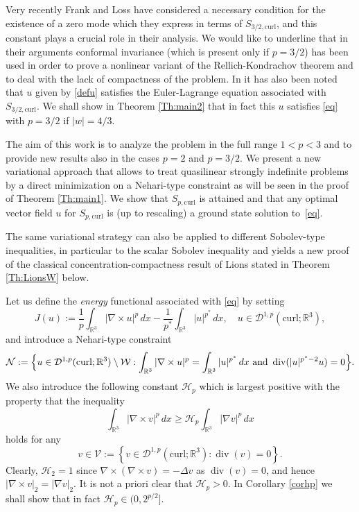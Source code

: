 \documentclass[12pt,leqno,twoside]{amsart}
\def\div{\mathop{\mathrm{div}}}
\def\R{\mathbb{R}}
\def\curl{\mathrm{curl}}
\def\Wc{\mathscr{W}}
\newcommand{\cD}{{\mathcal D}}
\newcommand{\cH}{{\mathcal H}}
\newcommand{\cN}{{\mathcal N}}
\newcommand{\cV}{{\mathcal V}}
\newcommand{\cW}{{\mathcal W}}
\def\r{\mathbb{R}}
\def\r3{\mathbb{R}^3}
\def\Wc{\cD^{1,p}(\curl;\R^3)}
\def\curlop{\nabla\times}
\numberwithin{equation}{section}
\begin{document}
Very recently Frank and Loss \cite{FrankLoss1,FrankLoss2,FrankLoss3} have considered a necessary condition for the existence of a zero mode which they express in terms of $S_{3/2,\curl}$, and this constant plays a crucial role in their analysis. We would like to underline that in their arguments conformal invariance (which is present only if $p=3/2$) has been used in order to prove a nonlinear variant of the Rellich-Kondrachov theorem and to deal with the lack of compactness of the problem. In \cite{FrankLoss2} it has also been noted that $u$ given by \eqref{defu} satisfies the Euler-Lagrange equation associated with $S_{3/2,\curl}$. We shall show in Theorem \ref{Th:main2} that in fact this $u$ satisfies \eqref{eq} with $p=3/2$ if $|w|=4/3$. 


The aim of this work is to analyze the problem in the full range $1 < p < 3$ and to provide new results also in the cases $p = 2$ and $p = 3/2$. We present a new variational approach that allows to treat quasilinear strongly indefinite problems by a direct minimization on a Nehari-type constraint as will be seen in the proof of Theorem \ref{Th:main1}.
We show that $S_{p,\curl}$ is attained and  that any optimal vector field $u$ for $S_{p,\curl}$ is (up to rescaling) a ground state solution to~\eqref{eq}. 

The same variational strategy can also be applied to different Sobolev-type inequalities, in particular to the scalar
	Sobolev inequality and yields a new proof of the classical
	concentration-compactness result of Lions \cite{Lions} stated in
	Theorem \ref{Th:LionsW} below.

Let us define the {\em energy} functional associated with \eqref{eq} by setting
\begin{equation}\label{eq:action}
	J(u):=\frac1p\int_{\R^3} |\curlop u|^p\,dx- \frac1{p^*}\int_{\R^3} |u|^{p^*}\, dx,\quad u\in \Wc,
	\end{equation}
and  introduce a Nehari-type constraint
\begin{equation}\label{def:Neh}
	\cN:=\Big\{u\in \Wc\setminus\cW: \int_{\R^3}|\curlop  u|^p=\int_{\R^3}|u|^{p^*}\, dx\hbox{ and }\div(|u|^{p^*-2}u)=0\Big\}.
	\end{equation}
We also introduce the following constant $\cH_p$ which is largest positive with the property that the inequality
\begin{equation}\label{eq:neqH_p}
	\int_{\r3}|\curlop v|^p\, dx\geq \cH_p \int_{\r3}|\nabla v|^p\, dx
\end{equation}
holds for any
$$v\in \cV:=\left\{v\in \Wc: \div(v) =0\right\}.$$
Clearly, $\cH_2=1$ since $\curlop (\curlop v)=-\Delta v$ as $\div(v)=0$, and hence $|\curlop v|_2=|\nabla v|_2$. It is not a priori clear that $\cH_p>0$. In Corollary \ref{corhp} we shall show that in fact $\cH_p\in (0,2^{p/2}]$.
\end{document}
